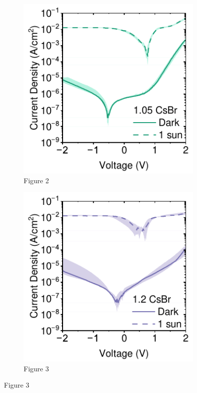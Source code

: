 \begin{figure}[htbp]
\begin{subfigure}[b]{0.3\textwidth}
        \includegraphics[width=\textwidth]{chapters/material_properties/images/105CsBr.pdf}
        \caption{Figure 2}
    \end{subfigure}
    \hfill
    \begin{subfigure}[b]{0.3\textwidth}
        \centering
        \includegraphics[width=\textwidth]{chapters/material_properties/images/12CsBr.pdf}
        \caption{Figure 3}
    \end{subfigure}


\end{figure}
